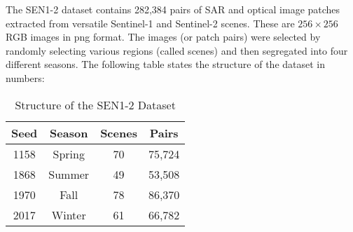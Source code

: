 The SEN1-2 dataset contains 282,384 pairs of SAR and optical image patches extracted from versatile Sentinel-1 and Sentinel-2 scenes. These are $256\times256$ RGB images in png format. The images (or patch pairs) were selected by randomly selecting various regions (called scenes) and then segregated into four different seasons. The following table states the structure of the dataset in numbers:

\begin{table}[h!]
    \begin{center}
        \begin{tabular}{|c|c|c|c|}
            \hline
            Seed & Season & Scenes & Pairs \\
            \hline
            1158 & Spring & 70 & 75,724 \\
            1868 & Summer & 49 & 53,508 \\
            1970 & Fall & 78 & 86,370 \\
            2017 & Winter & 61 & 66,782 \\
            \hline
        \end{tabular}
    \end{center}
    \caption{Structure of the SEN1-2 Dataset}
    \label{table:senStruct}
\end{table}